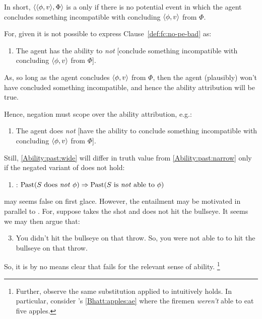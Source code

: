 \begin{note}
  In short, \(\langle \langle \phi, v \rangle, \Phi \rangle\) is a \fc{} only if there is no potential event in which the agent concludes something incompatible with concluding \(\langle \phi, v \rangle\) from \(\Phi\).

  For, given \BoyPS{} it is not possible to express Clause~\ref{def:fc:no-pe-bad} as:
  \begin{enumerate}[label=\emph{n}., ref=(\emph{n})]
  \item
    \label{Ability:past:narrow}
    The agent has the ability to \emph{not} [conclude something incompatible with concluding \(\langle \phi, v \rangle\) from \(\Phi\)].
  \end{enumerate}
  As, so long as the agent concludes \(\langle \phi, v \rangle\) from \(\Phi\), then the agent (plausibly) won't have concluded something incompatible, and hence the ability attribution will be true.

  Hence, negation must scope over the ability attribution, e.g.:

  \begin{enumerate}[label=\emph{w}., ref=(\emph{w})]
  \item
    \label{Ability:past:wide}
    The agent does \emph{not} [have the ability to conclude something incompatible with concluding \(\langle \phi, v \rangle\) from \(\Phi\)].
  \end{enumerate}

  Still, \ref{Ability:past:wide} will differ in truth value from \ref{Ability:past:narrow} only if the negated variant of \BoyPS{} does not hold:
  \begin{enumerate}[label=]
  \item
    \label{Boylan:Past-Success:CQC}
    \BoyPSCQC{}: \(\text{Past}(S\text{ does \emph{not} }\phi) \Rightarrow \text{Past}(S\text{ is \emph{not} able to }\phi)\)
  \end{enumerate}
  \BoyPSCQC{} may seems false on first glace.
  However, the entailment may be motivated in parallel to \BoyPS{}.
  For, suppose \citeauthor{Boylan:2020aa} takes the shot and does not hit the bullseye.
  It seems we may then argue that:

  \begin{enumerate}[label=\arabic*\('\).]
    \setcounter{enumi}{2}
  \item
    You didn't hit the bullseye on that throw.\newline
    So, you were not able to to hit the bullseye on that throw.
  \end{enumerate}
  So, it is by no means clear that \BoyPSCQC{} fails for the relevant sense of ability.%
  \footnote{
    Further, observe the same substitution applied to \BoyPSC{} intuitively holds.
    In particular, consider \citeauthor{Bhatt:2008aa}'s \ref{Bhatt:apples:ae} where the firemen \emph{weren't} able to eat five apples.
  }
\end{note}

